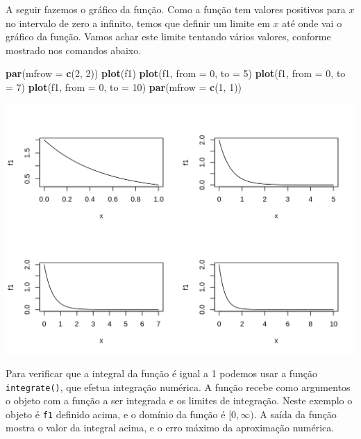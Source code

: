 \documentclass[10pt,a4paper]{book}
\newenvironment{Shaded}{\begin{snugshade}}{\end{snugshade}}
\newcommand{\KeywordTok}[1]{\textcolor[rgb]{0.13,0.29,0.53}{\textbf{#1}}}
\newcommand{\DataTypeTok}[1]{\textcolor[rgb]{0.13,0.29,0.53}{#1}}
\newcommand{\DecValTok}[1]{\textcolor[rgb]{0.00,0.00,0.81}{#1}}
\newcommand{\NormalTok}[1]{#1}
\begin{document}
A seguir fazemos o gráfico da função. Como a função tem valores
positivos para \(x\) no intervalo de zero a infinito, temos que definir
um limite em \(x\) até onde vai o gráfico da função. Vamos achar este
limite tentando vários valores, conforme mostrado nos comandos abaixo.

\begin{Shaded}
\begin{Highlighting}[]
\KeywordTok{par}\NormalTok{(}\DataTypeTok{mfrow =} \KeywordTok{c}\NormalTok{(}\DecValTok{2}\NormalTok{, }\DecValTok{2}\NormalTok{))}
\KeywordTok{plot}\NormalTok{(f1)}
\KeywordTok{plot}\NormalTok{(f1, }\DataTypeTok{from =} \DecValTok{0}\NormalTok{, }\DataTypeTok{to =} \DecValTok{5}\NormalTok{)}
\KeywordTok{plot}\NormalTok{(f1, }\DataTypeTok{from =} \DecValTok{0}\NormalTok{, }\DataTypeTok{to =} \DecValTok{7}\NormalTok{)}
\KeywordTok{plot}\NormalTok{(f1, }\DataTypeTok{from =} \DecValTok{0}\NormalTok{, }\DataTypeTok{to =} \DecValTok{10}\NormalTok{)}
\KeywordTok{par}\NormalTok{(}\DataTypeTok{mfrow =} \KeywordTok{c}\NormalTok{(}\DecValTok{1}\NormalTok{, }\DecValTok{1}\NormalTok{))}
\end{Highlighting}
\end{Shaded}

\begin{center}\includegraphics{figures/unnamed-chunk-327-1} \end{center}

Para verificar que a integral da função é igual a 1 podemos usar a
função \texttt{integrate()}, que efetua integração numérica. A função
recebe como argumentos o objeto com a função a ser integrada e os
limites de integração. Neste exemplo o objeto é \texttt{f1} definido
acima, e o domínio da função é \([0, \infty)\). A saída da função mostra
o valor da integral acima, e o erro máximo da aproximação numérica.
\end{document}
